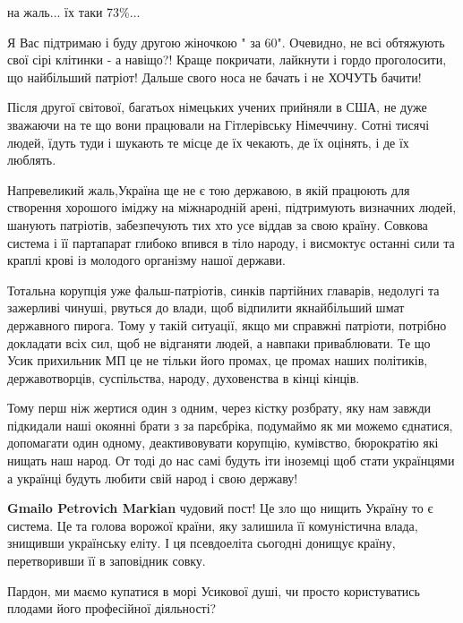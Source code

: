 \begin{itemize}
на жаль... їх таки 73\%...


Я Вас підтримаю і буду другою жіночкою " за 60". Очевидно, не всі обтяжують
свої сірі клітинки - а навіщо?! Краще покричати, лайкнути і гордо проголосити,
що найбільший патріот! Дальше свого носа не бачать і не ХОЧУТЬ бачити!


Після другої світової, багатьох німецьких учених прийняли в США, не дуже
зважаючи на те що вони працювали на Гітлерівську Німеччину. Сотні тисячі людей,
їдуть туди і шукають те місце де їх чекають, де їх оцінять, і де їх люблять.

Напревеликий жаль,Україна ще не є тою державою, в якій працюють для створення
хорошого іміджу на міжнародній арені, підтримують визначних людей, шанують
патріотів, забезпечують тих хто усе віддав за свою країну. Совкова система і її
партапарат глибоко впився в тіло народу, і висмоктує останні сили та краплі
крові із молодого організму нашої держави. 

Тотальна корупція уже фальш-патріотів, синків партійних главарів, недолугі та
зажерливі чинуші, рвуться до влади, щоб відпилити якнайбільший шмат державного
пирога. Тому у такій ситуації, якщо ми справжні патріоти, потрібно докладати
всіх сил, щоб не відганяти людей, а навпаки приваблювати. Те що Усик прихильник
МП це не тільки його промах, це промах наших політиків, державотворців,
суспільства, народу, духовенства в кінці кінців. 

Тому перш ніж жертися один з одним, через кістку розбрату, яку нам завжди
підкидали наші окоянні брати з за парєбріка, подумаймо як ми можемо єднатися,
допомагати один одному, деактивовувати корупцію, кумівство, бюрократію які
нищать наш народ. От тоді до нас самі будуть іти іноземці щоб стати українцями
а українці будуть любити свій народ і свою державу!

\begin{itemize} %
\textbf{Gmailo Petrovich Markian} чудовий пост! Це зло що нищить Україну то є система. Це та голова ворожої країни, яку залишила її комуністична влада, знищивши українську еліту. І ця псевдоеліта сьогодні донищує країну, перетворивши її в заповідник совку.
\end{itemize} %


Пардон, ми маємо купатися в морі Усикової душі, чи просто користуватись плодами
його професійної діяльності?


\end{itemize}
